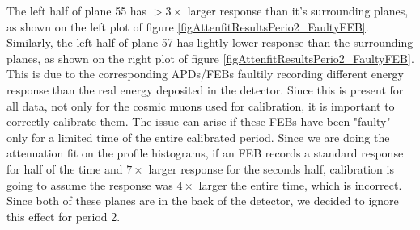 \documentclass[12pt,a4paper]{article}
\begin{document}
The left half of plane 55 has $>3\times$ larger response than it's surrounding planes, as shown on the left plot of figure \ref{figAttenfitResultsPerio2_FaultyFEB}. Similarly, the left half of plane 57 has lightly lower response than the surrounding planes, as shown on the right plot of figure \ref{figAttenfitResultsPerio2_FaultyFEB}. This is due to the corresponding APDs/FEBs faultily recording different energy response than the real energy deposited in the detector. Since this is present for all data, not only for the cosmic muons used for calibration, it is important to correctly calibrate them. The issue can arise if these FEBs have been "faulty" only for a limited time of the entire calibrated period. Since we are doing the attenuation fit on the profile histograms, if an FEB records a standard response for half of the time and $7\times$ larger response for the seconds half, calibration is going to assume the response was $4\times$ larger the entire time, which is incorrect. Since both of these planes are in the back of the detector, we decided to ignore this effect for period 2.
\end{document}

